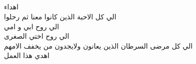 \newpage
\begin{otherlanguage}{arabic}
\section*{}
\begin{center}
{\large
اهداء \\ 
\vspace{50mm}
الي كل الاحبة الذين كانوا معنا ثم رحلوا \\
الي روح ابي و امي \\
الي روح اختي الصغرى \\
الي كل مرضى السرطان الذين يعانون ولايجدون من يخفف الامهم \\
اهدي هذا العمل
}
\end{center}
\end{otherlanguage}
